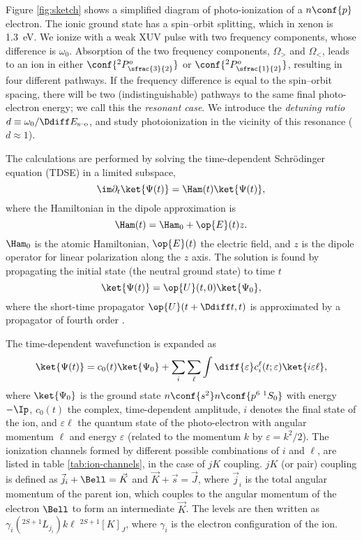 Figure \ref{fig:sketch} shows a simplified diagram of photo-ionization
of a \(n\conf{p}\) electron. The ionic ground state has a spin--orbit
splitting, which in xenon is \SI{1.3}{\electronvolt}. We ionize with a
weak XUV pulse with two frequency components, whose difference is
\(\omega_0\). Absorption of the two frequency components, \(\Omega_>\) and
\(\Omega_<\), leads to an ion in either
\(\conf{^2P^{o}_{\sfrac{3}{2}}}\) or
\(\conf{^2P^{o}_{\sfrac{1}{2}}}\), resulting in four different
pathways. If the frequency difference is equal to the spin--orbit
spacing, there will be two (indistinguishable) pathways to the same
final photo-electron energy; we call this the \emph{resonant case}. We
introduce the \emph{detuning ratio}
\(d\equiv\omega_0/\Ddiff E_{\textrm{s--o}}\), and study photoionization in the
vicinity of this resonance (\(d\approx1\)).

The calculations are performed by solving the time-dependent
Schrödinger equation (TDSE) in a limited subspace,
\begin{equation}
  \label{eqn:tdse}
  \im\partial_t\ket{\Psi(t)} = \Ham(t)\ket{\Psi(t)},
\end{equation}
where the Hamiltonian in the dipole approximation is
\begin{equation}
  \label{eqn:hamiltonian}
  \Ham(t) = \Ham_0 + \op{E}(t)z.
\end{equation}
\(\Ham_0\) is the atomic Hamiltonian, \(\op{E}(t)\) the electric
field, and \(z\) is the dipole operator for linear polarization
along the \(z\) axis. The solution is found by propagating the
initial state (the neutral ground state) to time \(t\)
\begin{equation}
  \ket{\Psi(t)} = \op{U}(t,0)\ket{\Psi_0},
\end{equation}
where the short-time propagator \(\op{U}(t+\Ddiff t,t)\) is
approximated by a \textcite{Magnus1954} propagator of fourth order
\parencite{Saad1992SJoNA,Alvermann2012}.

The time-dependent wavefunction is expanded as
\begin{equation}
  \label{eqn:expansion}
  \ket{\Psi(t)} =
  c_0(t)\ket{\Psi_0} +
  \sum_{i}\sum_{\ell}\int\diff{\varepsilon}
  c_{i}^{\ell}(t;\varepsilon)
  \ket{i \varepsilon \ell},
\end{equation}
where \(\ket{\Psi_0}\) is the ground state
\(n\conf{s^2}n\conf{p^6\;^1S_0}\) with energy \(-\Ip\), \(c_0(t)\) the
complex, time-dependent amplitude, \(i\) denotes the final state of
the ion, and \(\varepsilon \ell\) the quantum state of the photo-electron with
angular momentum \(\ell\) and energy \(\varepsilon\) (related to the momentum
\(k\) by \(\varepsilon=k^2/2\)).  The ionization channels formed by different
possible combinations of \(i\) and \(\ell\), are listed in table
\ref{tab:ion-channels}, in the case of \(jK\) coupling. \(jK\) (or
pair) coupling is defined as \parencite{Cowan1981}
\(\vec{j}_i + \Bell = \vec{K}\) and \(\vec{K} + \vec{s} = \vec{J}\),
where \(\vec{j}_i\) is the total angular momentum of the parent ion,
which couples to the angular momentum of the electron \(\Bell\) to
form an intermediate \(\vec{K}\). The levels are then written as
\(\gamma_i(^{2S+1}L_{j_i})k\ell\;^{2S+1}[K]_J\), where \(\gamma_i\) is the electron
configuration of the ion.

